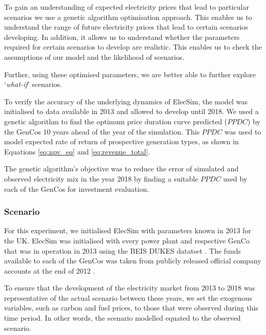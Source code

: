 To gain an understanding of expected electricity prices that lead to particular scenarios we use a genetic algorithm optimisation approach. This enables us to understand the range of future electricity prices that lead to certain scenarios developing. In addition, it allows us to understand whether the parameters required for certain scenarios to develop are realistic. This enables us to check the assumptions of our model and the likelihood of scenarios.

Further, using these optimised parameters, we are better able to further explore `\textit{what-if}' scenarios.















To verify the accuracy of the underlying dynamics of ElecSim, the model was initialised to data available in 2013 and allowed to develop until 2018. We used a genetic algorithm to find the optimum price duration curve predicted ($PPDC$) by the GenCos 10 years ahead of the year of the simulation. This $PPDC$ was used to model expected rate of return of prospective generation types, as shown in Equations \ref{eq:npv_eq} and \ref{eq:revenue_total}. 

The genetic algorithm's objective was to reduce the error of simulated and observed electricity mix in the year 2018 by finding a suitable $PPDC$ used by each of the GenCos for investment evaluation.

\subsubsection{Scenario}

For this experiment, we initialised ElecSim with parameters known in 2013 for the UK. ElecSim was initialised with every power plant and respective GenCo that was in operation in 2013 using the BEIS DUKES datatset \cite{dukes_511}. The funds available to each of the GenCos was taken from publicly released official company accounts at the end of 2012 \cite{companies_house}.

To ensure that the development of the electricity market from 2013 to 2018 was representative of the actual scenario between these years, we set the exogenous variables, such as carbon and fuel prices, to those that were observed during this time period. In other words, the scenario modelled equated to the observed scenario. 

